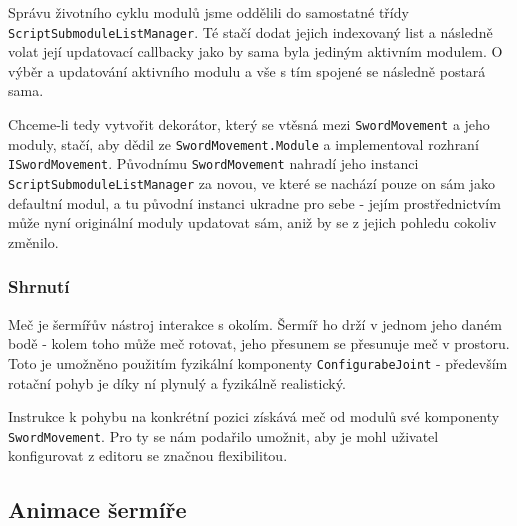 Správu životního cyklu modulů jsme oddělili do samostatné třídy \texttt{ScriptSubmoduleListManager}. Té stačí dodat jejich indexovaný list a následně volat její updatovací callbacky jako by sama byla jediným aktivním modulem. O výběr a updatování aktivního modulu a vše s tím spojené se následně postará sama. 

Chceme-li tedy vytvořit dekorátor, který se vtěsná mezi \texttt{SwordMovement} a jeho moduly, stačí, aby dědil ze \texttt{SwordMovement.Module} a implementoval rozhraní \texttt{ISwordMovement}. Původnímu \texttt{SwordMovement} nahradí jeho instanci \texttt{ScriptSubmoduleListManager} za novou, ve které se nachází pouze on sám jako defaultní modul, a tu původní instanci ukradne pro sebe - jejím prostřednictvím může nyní originální moduly updatovat sám, aniž by se z jejich pohledu cokoliv změnilo.


\subsubsection*{Shrnutí}

Meč je šermířův nástroj interakce s okolím. Šermíř ho drží v jednom jeho daném bodě - kolem toho může meč rotovat, jeho přesunem se přesunuje meč v prostoru. Toto je umožněno použitím fyzikální komponenty \texttt{ConfigurabeJoint} - především rotační pohyb je díky ní plynulý a fyzikálně realistický. 

Instrukce k pohybu na konkrétní pozici získává meč od modulů své komponenty \texttt{SwordMovement}. Pro ty se nám podařilo umožnit, aby je mohl uživatel konfigurovat z editoru se značnou flexibilitou.



\subsection{Animace šermíře} \label{swordsmanAnimationSubsection}

